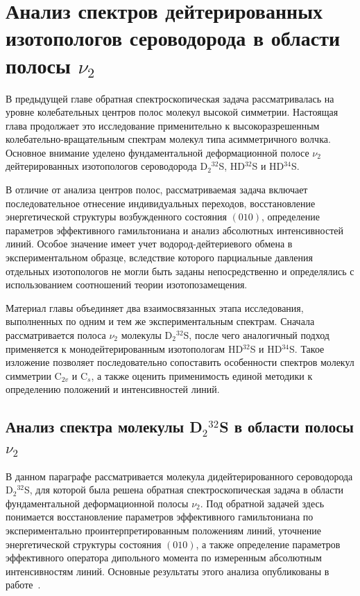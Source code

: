 \chapter{Анализ спектров дейтерированных изотопологов сероводорода в области полосы $\nu_2$}\label{ch:ch3}

В предыдущей главе обратная спектроскопическая задача рассматривалась на уровне колебательных центров
полос молекул высокой симметрии. Настоящая глава продолжает это исследование применительно к
высокоразрешенным колебательно-вращательным спектрам молекул типа асимметричного волчка. Основное
внимание уделено фундаментальной деформационной полосе $\nu_2$ дейтерированных изотопологов
сероводорода D$_2{}^{32}$S, HD$^{32}$S и HD$^{34}$S.

В отличие от анализа центров полос, рассматриваемая задача включает последовательное отнесение
индивидуальных переходов, восстановление энергетической структуры возбужденного состояния $(010)$,
определение параметров эффективного гамильтониана и анализ абсолютных интенсивностей линий. Особое
значение имеет учет водород-дейтериевого обмена в экспериментальном образце, вследствие которого
парциальные давления отдельных изотопологов не могли быть заданы непосредственно и определялись с
использованием соотношений теории изотопозамещения.

Материал главы объединяет два взаимосвязанных этапа исследования, выполненных по одним и тем же
экспериментальным спектрам. Сначала рассматривается полоса $\nu_2$ молекулы D$_2{}^{32}$S, после чего
аналогичный подход применяется к монодейтерированным изотопологам HD$^{32}$S и HD$^{34}$S. Такое
изложение позволяет последовательно сопоставить особенности спектров молекул симметрии C$_{2v}$ и
C$_s$, а также оценить применимость единой методики к определению положений и интенсивностей линий.

\section{Анализ спектра молекулы D$_2{}^{32}$S в области полосы $\nu_2$}\label{sec:ch3/D2S}\label{sec:ch2/D2S}

В данном параграфе рассматривается молекула дидейтерированного сероводорода D$_2{}^{32}$S, для
которой была решена обратная спектроскопическая задача в области фундаментальной деформационной
полосы $\nu_2$. Под обратной задачей здесь понимается восстановление параметров эффективного
гамильтониана по экспериментально проинтерпретированным положениям линий, уточнение энергетической
структуры состояния $(010)$, а также определение параметров эффективного оператора дипольного момента
по измеренным абсолютным интенсивностям линий. Основные результаты этого анализа опубликованы в
работе~\cite{d2s_sydow2019}.

